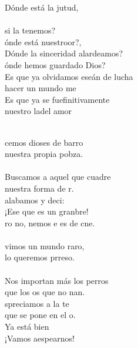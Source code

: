 \begin{cancion}%
	\begin{chorus}%
	Dónde está la jutud,\\
	\jump\\
si la tenemos?\\
	ónde está nuestroor?,\\
	Dónde la sinceridad  alardeamos?\\
	ónde hemos guardado Dios?\\
	Es que ya olvidamos eseán de lucha\\
	 hacer un mundo me\\
	Es que ya se fuefinitivamente\\
	nuestro ladel amor\\
	\end{chorus}%
	\jump\\
	cemos dioses de barro\\
	 nuestra propia pobza.\\
	\jump\\
Buscamos a aquel que cuadre\\
	 nuestra forma de r.\\
	 alabamos y deci:\\
	¡Ese que es un granbre! \\
	ro no, nemos e es de cne.\\
	\jump\\
	vimos un mundo raro,\\
	lo queremos prreso.\\
	\jump\\
Nos importan más los perros\\
	que los os que no nan. \\
	spreciamos a la te\\
	que se pone en el o.\\
	Ya está bien\\
	¡Vamos aespearnos!\\
\end{cancion}%
